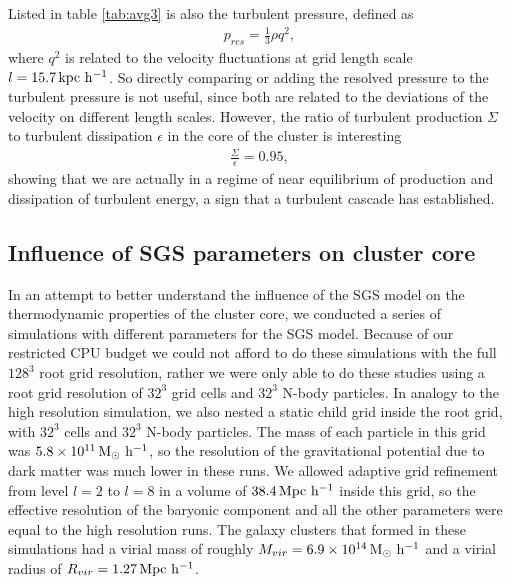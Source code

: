 Listed in table \ref{tab:avg3} is also the turbulent pressure, defined as
\begin{align}
p_{res}=\frac{1}{3} \rho q^2,
\end{align}
where $q^2$ is related to the velocity fluctuations at grid length scale 
$l=\unit[15.7]{kpc\ h^{-1}}$. So directly comparing or adding the resolved
pressure to the turbulent pressure is not useful, since both are related to the
deviations of the velocity on different length scales. However,
the ratio of turbulent production $\Sigma$ to turbulent dissipation $\epsilon$
in the core of the cluster is interesting
\begin{align}
\frac{\Sigma}{\epsilon}=0.95,
\end{align}
showing that we are actually in a regime of near equilibrium of production and
dissipation of turbulent energy, a sign that a turbulent cascade has
established.

\subsection{Influence of SGS parameters on cluster core}
In an attempt to better understand the influence of the SGS model on the
thermodynamic properties of the cluster core, we conducted a series of
simulations with different parameters for the SGS model. Because of our
restricted CPU budget we could not afford to do these simulations with the full
$128^3$ root grid resolution, rather we were only able to do these studies using
a
root grid resolution of $32^3$ grid cells and $32^3$ N-body particles. In
analogy to the high resolution simulation, we also nested a static child grid
inside the root grid, with $32^3$ cells and $32^3$ N-body particles. The mass
of each particle in this grid was $\unit[5.8 \times 10^{11}]{M_{\odot}\
h^{-1}}$,
so the resolution of the gravitational potential due to dark matter was much
lower in these runs. We allowed adaptive grid refinement from level
$l=2$ to $l=8$ in a volume of $\unit[38.4]{Mpc\ h^{-1}}$ inside this grid, so
the effective resolution of the baryonic component and all the other
parameters were equal to the high resolution runs.
The galaxy clusters that formed in these simulations had a virial mass of
roughly $M_{vir}=\unit[6.9 \times 10^{14}]{M_{\odot}\ h^{-1}}$ and a virial
radius
of $R_{vir}=\unit[1.27]{Mpc\ h^{-1}}$.

